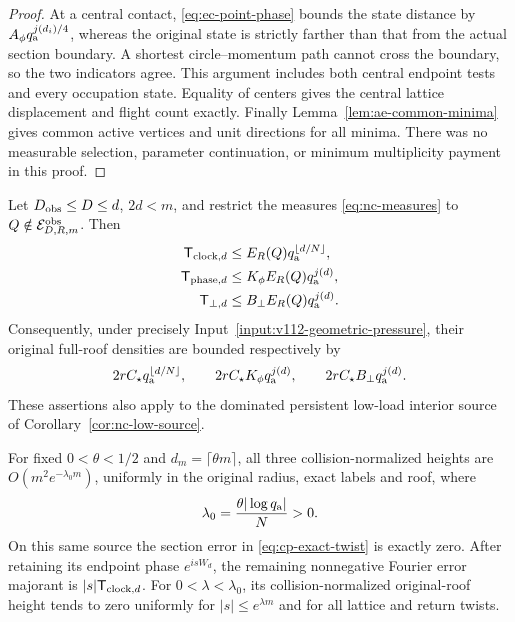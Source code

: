 \begin{proof}
At a central contact, \eqref{eq:ec-point-phase} bounds the state
distance by $A_\phi q_{\rm a}^{j(d_i)/4}$, whereas the original
state is strictly farther than that from the actual section
boundary.  A shortest circle--momentum path cannot cross the
boundary, so the two indicators agree.  This argument includes both
central endpoint tests and every occupation state.  Equality of
centers gives the central lattice displacement and flight count
exactly.  Finally Lemma~\ref{lem:ae-common-minima} gives common
active vertices and unit directions for all minima.  There was no
measurable selection, parameter continuation, or minimum multiplicity
payment in this proof.
\end{proof}

\begin{corollary}
\label{cor:ec-normalized}
Let $D_{\rm obs}\le D\le d$, $2d<m$, and restrict the measures
\eqref{eq:nc-measures} to
$Q\notin\mathcal E^{\rm obs}_{D,R,m}$.  Then
\begin{align}\label{eq:ec-exponential-costs}
 \mathsf T_{{\rm clock},d}
     &\le E_R(Q)q_{\rm a}^{\lfloor d/N\rfloor},\notag\\
 \mathsf T_{{\rm phase},d}
     &\le K_\phi E_R(Q)q_{\rm a}^{j(d)},\\
 \mathsf T_{\perp,d}
     &\le B_\perp E_R(Q)q_{\rm a}^{j(d)}.\notag
\end{align}
Consequently, under precisely
Input~\ref{input:v112-geometric-pressure}, their original full-roof
densities are bounded respectively by
\[
 2rC_\star q_{\rm a}^{\lfloor d/N\rfloor},\qquad
 2rC_\star K_\phi q_{\rm a}^{j(d)},\qquad
 2rC_\star B_\perp q_{\rm a}^{j(d)}.
\]
These assertions also apply to the dominated persistent low-load
interior source of Corollary~\ref{cor:nc-low-source}.

For fixed $0<\theta<1/2$ and $d_m=\lceil\theta m\rceil$, all three
collision-normalized heights are $O(m^2e^{-\lambda_0m})$, uniformly
in the original radius, exact labels and roof, where
\begin{equation}\label{eq:ec-lambda}
 \lambda_0=\frac{\theta|\log q_{\rm a}|}{N}>0.
\end{equation}
On this same source the section error in
\eqref{eq:cp-exact-twist} is exactly zero.  After retaining its
endpoint phase $e^{isW_d}$, the remaining nonnegative Fourier error
majorant is $|s|\mathsf T_{{\rm clock},d}$.
For $0<\lambda<\lambda_0$, its collision-normalized original-roof
height tends to zero uniformly for $|s|\le e^{\lambda m}$ and for
all lattice and return twists.
\end{corollary}
